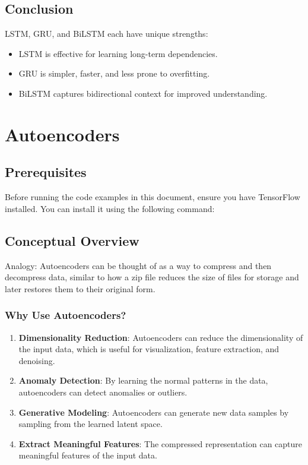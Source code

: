 \documentclass[
  letterpaper,
  DIV=11,
  numbers=noendperiod]{scrreprt}
\providecommand{\tightlist}{%
  \setlength{\itemsep}{0pt}\setlength{\parskip}{0pt}}\usepackage{longtable,booktabs,array}
\begin{document}
\section{Conclusion}\label{conclusion-8}

LSTM, GRU, and BiLSTM each have unique strengths:

\begin{itemize}
\tightlist
\item
  LSTM is effective for learning long-term dependencies.
\item
  GRU is simpler, faster, and less prone to overfitting.
\item
  BiLSTM captures bidirectional context for improved understanding.
\end{itemize}


\chapter{Autoencoders}\label{autoencoders}

\section{Prerequisites}\label{prerequisites}

Before running the code examples in this document, ensure you have
TensorFlow installed. You can install it using the following command:

\section{Conceptual Overview}\label{conceptual-overview}

Analogy: Autoencoders can be thought of as a way to compress and then
decompress data, similar to how a zip file reduces the size of files for
storage and later restores them to their original form.

\subsection{Why Use Autoencoders?}\label{why-use-autoencoders}

\begin{enumerate}
\def\labelenumi{\arabic{enumi}.}
\item
  \textbf{Dimensionality Reduction}: Autoencoders can reduce the
  dimensionality of the input data, which is useful for visualization,
  feature extraction, and denoising.
\item
  \textbf{Anomaly Detection}: By learning the normal patterns in the
  data, autoencoders can detect anomalies or outliers.
\item
  \textbf{Generative Modeling}: Autoencoders can generate new data
  samples by sampling from the learned latent space.
\item
  \textbf{Extract Meaningful Features}: The compressed representation
  can capture meaningful features of the input data.
\end{enumerate}
\end{document}
